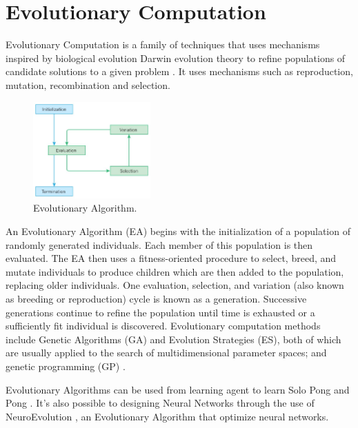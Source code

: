 \section{Evolutionary Computation}

Evolutionary Computation is a family of techniques that uses mechanisms inspired by biological evolution Darwin evolution theory to refine populations of candidate solutions to a given problem \cite{vikhar2016evolutionary}. It uses mechanisms such as reproduction, mutation, recombination and selection.

\begin{figure}[ht]
    \centering
    \includegraphics[width=0.4\textwidth]{images/Evolutionary_algorithms.jpg}
    \caption{Evolutionary Algorithm.}
\end{figure}

An Evolutionary Algorithm (EA) begins with the initialization of a population of randomly generated individuals. Each member of this population is then evaluated. The EA then uses a fitness-oriented procedure to select, breed, and mutate individuals to produce children which are then added to the population, replacing older individuals. One evaluation, selection, and variation (also known as breeding or reproduction) cycle is known as a generation. Successive generations continue to refine the population until time is exhausted or a sufficiently fit individual is discovered. Evolutionary computation methods include Genetic Algorithms (GA) and Evolution Strategies (ES), both of which are usually applied to the search of multidimensional parameter spaces; and genetic programming (GP) \cite{panait2005cooperative, vikhar2016evolutionary}.

Evolutionary Algorithms can be used from learning agent to learn Solo Pong \cite{langdon2005evolutionary} and Pong \cite{mcbrien2020learning}.
It's also possible to designing Neural Networks through the use of NeuroEvolution \cite{stanley2019designing}, an Evolutionary Algorithm that optimize neural networks.